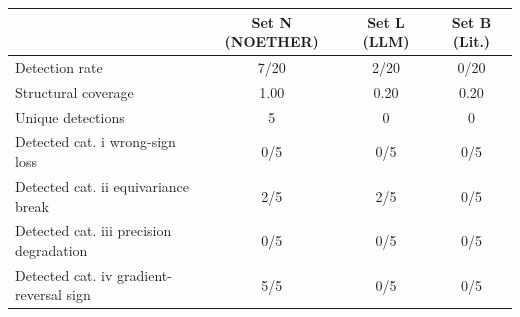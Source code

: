 \begin{tabular}{lccc}
\toprule
& Set N (NOETHER) & Set L (LLM) & Set B (Lit.) \\
\midrule
Detection rate & 7/20 & 2/20 & 0/20 \\
Structural coverage & 1.00 & 0.20 & 0.20 \\
Unique detections & 5 & 0 & 0 \\
Detected cat. i wrong-sign loss & 0/5 & 0/5 & 0/5 \\
Detected cat. ii equivariance break & 2/5 & 2/5 & 0/5 \\
Detected cat. iii precision degradation & 0/5 & 0/5 & 0/5 \\
Detected cat. iv gradient-reversal sign & 5/5 & 0/5 & 0/5 \\
\bottomrule
\end{tabular}